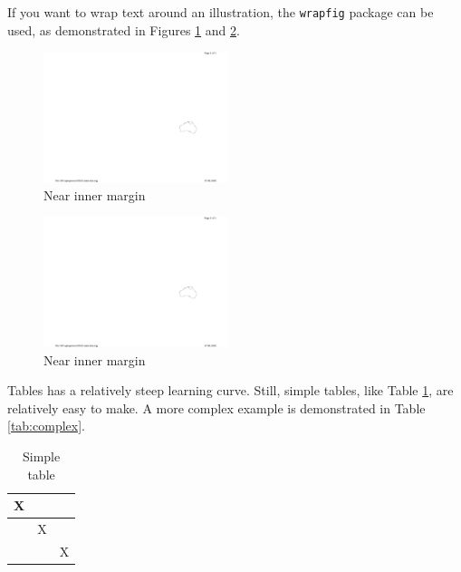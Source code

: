 If you want to wrap text around an illustration, the {\tt wrapfig} package can be used, as demonstrated in Figures \ref{fig:wrap-inner} and \ref{fig:wrap-outer}.

\lipsum[92]

\begin{figure}
  \centering 
  \includegraphics[width=0.48\textwidth]{introaustralia}
  \caption{Near inner margin}
  \label{fig:wrap-inner}
\end{figure}

\lipsum[97]

\begin{figure}
  \centering 
  \includegraphics[width=0.48\textwidth]{introaustralia}
  \caption{Near inner margin}
  \label{fig:wrap-outer}
\end{figure}

Tables has a relatively steep learning curve.
Still, simple tables, like Table \ref{tab:simple}, are relatively easy to make.
A more complex example is demonstrated in Table \ref{tab:complex}.

\begin{table}[!h]
\centering
\begin{tabular}{c|c|c}
X &  & \\
\hline
& X & \\
\hline
 &  & X \\
\end{tabular}
\caption{Simple table}
\label{tab:simple}
\end{table}

